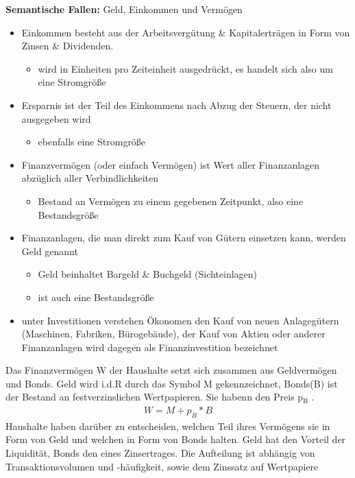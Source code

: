 \documentclass[11pt]{article}
\begin{document}
\textbf{Semantische Fallen:} Geld, Einkommen und Vermögen
\begin{itemize}
\item Einkommen besteht aus der Arbeitsvergütung \& Kapitalerträgen in Form von Zinsen \& Dividenden.
\begin{itemize}
\item wird in Einheiten pro Zeiteinheit ausgedrückt, es handelt sich also um eine Stromgröße
\end{itemize}
\item Ersparnis ist der Teil des Einkommens nach Abzug der Steuern, der nicht ausgegeben wird
\begin{itemize}
\item ebenfalls eine Stromgröße
\end{itemize}
\item Finanzvermögen (oder einfach Vermögen) ist Wert aller Finanzanlagen abzüglich aller Verbindlichkeiten
\begin{itemize}
\item Bestand an Vermögen zu einem gegebenen Zeitpunkt, also eine Bestandsgröße
\end{itemize}
\item Finanzanlagen, die man direkt zum Kauf von Gütern einsetzen kann, werden Geld genannt
\begin{itemize}
\item Geld beinhaltet Bargeld \& Buchgeld (Sichteinlagen)
\item ist auch eine Bestandsgröße
\end{itemize}
\item unter Investitionen verstehen Ökonomen den Kauf von neuen Anlagegütern (Maschinen, Fabriken, Bürogebäude), der Kauf von Aktien oder anderer Finanzanlagen wird dagegen als Finanzinvestition bezeichnet
\end{itemize}

Das Finanzvermögen W der Haushalte setzt sich zusammen aus Geldvermögen und Bonds. Geld wird i.d.R durch das Symbol M gekennzeichnet, Bonds(B) ist der Bestand an festverzinslichen Wertpapieren. Sie habenn den Preis p\(_{\text{B}}\) .
\begin{equation*}
\begin{aligned}
W = M + p_B * B
\end{aligned}
\end{equation*}
Haushalte haben darüber zu entscheiden, welchen Teil ihres Vermögens sie in Form von Geld und welchen in Form von Bonds halten. Geld hat den Vorteil der Liquidität, Bonds den eines Zinsertrages. Die Aufteilung ist abhängig von Transaktionsvolumen und -häufigkeit, sowie dem Zinssatz auf Wertpapiere
\end{document}
